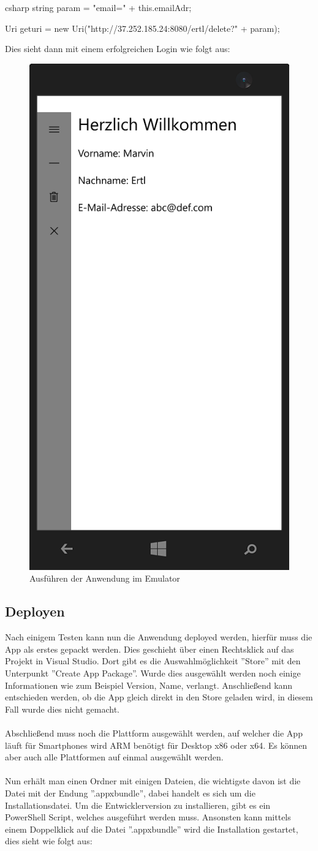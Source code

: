 \begin{code}{csharp}
	string param = "email=" + this.emailAdr;
	
	Uri geturi = new Uri("http://37.252.185.24:8080/ertl/delete?" + param);
\end{code}

Dies sieht dann mit einem erfolgreichen Login wie folgt aus:

\begin{figure}[H]
	\centering
	\includegraphics[width=0.4\linewidth]{images/screenshot006}
	\caption{Ausführen der Anwendung im Emulator}
	\label{fig:screenshot006}
\end{figure}


\subsection{Deployen}

Nach einigem Testen kann nun die Anwendung deployed werden, hierfür muss die App als erstes gepackt werden. Dies geschieht über einen Rechtsklick auf das Projekt in Visual Studio. Dort gibt es die Auswahlmöglichkeit ''Store'' mit den Unterpunkt ''Create App Package''. Wurde dies ausgewählt werden noch einige Informationen wie zum Beispiel Version, Name, verlangt. Anschließend kann entschieden werden, ob die App gleich direkt in den Store geladen wird, in diesem Fall wurde dies nicht gemacht.
\\\\
Abschließend muss noch die Plattform ausgewählt werden, auf welcher die App läuft für Smartphones wird ARM benötigt für Desktop x86 oder x64. Es können aber auch alle Plattformen auf einmal ausgewählt werden.
\\\\
Nun erhält man einen Ordner mit einigen Dateien, die wichtigste davon ist die Datei mit der Endung ''.appxbundle'', dabei handelt es sich um die Installationsdatei. \cite{packaging} Um die Entwicklerversion zu installieren, gibt es ein PowerShell Script, welches ausgeführt werden muss. Ansonsten kann mittels einem Doppelklick auf die Datei ''.appxbundle'' wird die Installation gestartet, dies sieht wie folgt aus: 

